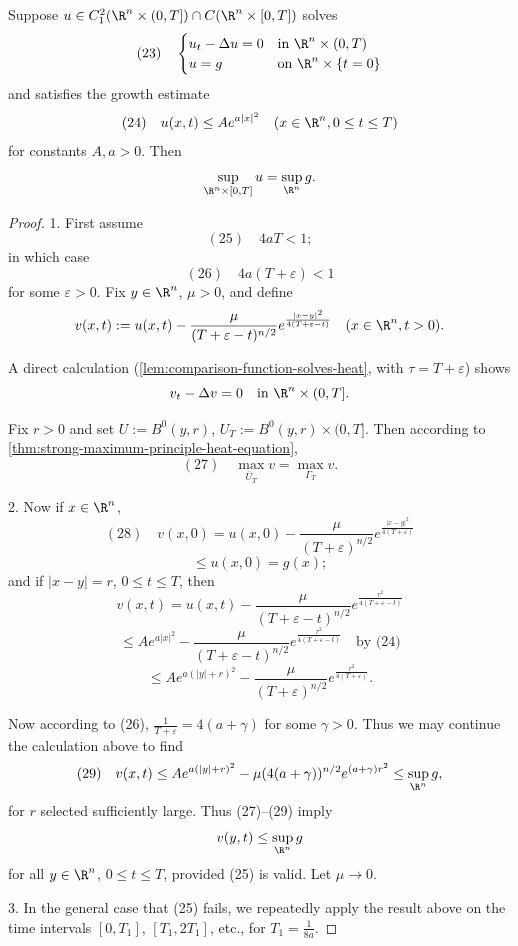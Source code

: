 \begin{theorem}
\label{thm:maximum-principle-heat-cauchy-problem}
\leanok
Suppose $u \in C_1^2(\R^n \times (0,T]) \cap C(\R^n \times [0,T])$ solves
$$(23) \quad \begin{cases}
u_t - \Delta u = 0 & \text{in } \R^n \times (0,T) \\
u = g & \text{on } \R^n \times \{t = 0\}
\end{cases}$$
and satisfies the growth estimate
$$(24) \quad u(x,t) \le Ae^{a|x|^2} \quad (x \in \R^n, 0 \le t \le T)$$
for constants $A, a > 0$. Then
$$\sup_{\R^n \times [0,T]} u = \sup_{\R^n} g.$$
\end{theorem}

\begin{proof}
1. First assume
$$(25) \quad 4aT < 1;$$
in which case
$$(26) \quad 4a(T + \varepsilon) < 1$$
for some $\varepsilon > 0$. Fix $y \in \R^n$, $\mu > 0$, and define
$$v(x,t) := u(x,t) - \frac{\mu}{(T + \varepsilon - t)^{n/2}} e^{\frac{|x-y|^2}{4(T + \varepsilon - t)}} \quad (x \in \R^n, t > 0).$$

A direct calculation (\cref{lem:comparison-function-solves-heat}, with $\tau = T +
\varepsilon$) shows
$$v_t - \Delta v = 0 \quad \text{in } \R^n \times (0,T].$$

Fix $r > 0$ and set $U := B^0(y,r)$, $U_T := B^0(y,r) \times (0,T]$. Then according to \cref{thm:strong-maximum-principle-heat-equation},
$$(27) \quad \max_{\overline{U}_T} v = \max_{\Gamma_T} v.$$

2. Now if $x \in \R^n$,
$$(28) \quad v(x,0) = u(x,0) - \frac{\mu}{(T+\varepsilon)^{n/2}} e^{\frac{|x-y|^2}{4(T+\varepsilon)}}$$
$$\leq u(x,0) = g(x);$$
and if $|x - y| = r$, $0 \leq t \leq T$, then
$$v(x,t) = u(x,t) - \frac{\mu}{(T+\varepsilon-t)^{n/2}} e^{\frac{r^2}{4(T+\varepsilon-t)}}$$
$$\leq Ae^{a|x|^2} - \frac{\mu}{(T+\varepsilon-t)^{n/2}} e^{\frac{r^2}{4(T+\varepsilon-t)}} \quad \text{by (24)}$$
$$\leq Ae^{a(|y|+r)^2} - \frac{\mu}{(T+\varepsilon)^{n/2}} e^{\frac{r^2}{4(T+\varepsilon)}}.$$

Now according to (26), $\frac{1}{T+\varepsilon} = 4(a+\gamma)$ for some $\gamma > 0$. Thus we may continue the calculation above to find
$$(29) \quad v(x,t) \leq Ae^{a(|y|+r)^2} - \mu(4(a+\gamma))^{n/2} e^{(a+\gamma)r^2} \leq \sup_{\R^n} g,$$
for $r$ selected sufficiently large. Thus (27)--(29) imply
$$v(y,t) \leq \sup_{\R^n} g$$
for all $y \in \R^n$, $0 \leq t \leq T$, provided (25) is valid. Let $\mu \to 0$.

3. In the general case that (25) fails, we repeatedly apply the result above on the time intervals $[0, T_1]$, $[T_1, 2T_1]$, etc., for $T_1 = \frac{1}{8a}$.
\end{proof}


